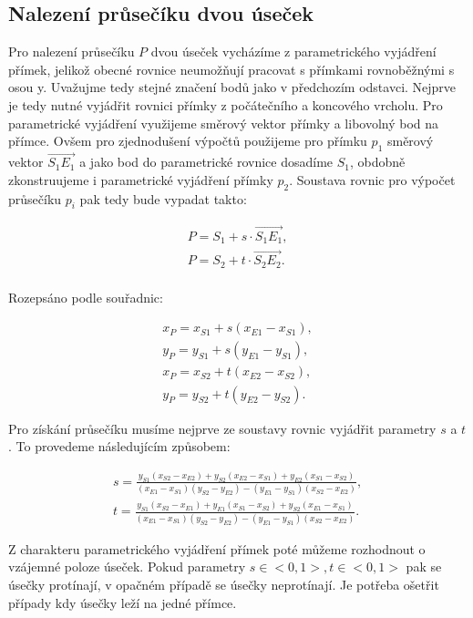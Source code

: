 \subsection{Nalezení průsečíku dvou úseček}
	Pro nalezení průsečíku $P$ dvou úseček vycházíme z parametrického vyjádření přímek, jelikož obecné rovnice neumožňují pracovat s přímkami rovnoběžnými s osou y. Uvažujme tedy stejné značení bodů jako v předchozím odstavci. Nejprve je tedy nutné vyjádřit rovnici přímky z počátečního a koncového vrcholu. Pro parametrické vyjádření využijeme směrový vektor přímky a libovolný bod na přímce. Ovšem pro zjednodušení výpočtů použijeme pro přímku $p_1$ směrový vektor $\overrightarrow{S_1E_1}$ a jako bod do parametrické rovnice dosadíme $S_1$, obdobně zkonstruujeme i parametrické vyjádření přímky $p_2$. Soustava rovnic pro výpočet průsečíku $p_i$ pak tedy bude vypadat takto:
	
\begin{align*} 
P = S_1 + s \cdot \overrightarrow{S_1E_1}, \\
P = S_2 + t \cdot \overrightarrow{S_2E_2}. \\
\end{align*}

Rozepsáno podle souřadnic:

\begin{align*} 
x_P = x_{S1} + s(x_{E1} - x_{S1}), \\
y_P = y_{S1} + s(y_{E1} - y_{S1}), \\
x_P = x_{S2} + t(x_{E2} - x_{S2}), \\
y_P = y_{S2} + t(y_{E2} - y_{S2}).
\end{align*}

Pro získání průsečíku musíme nejprve ze soustavy rovnic vyjádřit parametry $s$ a $t$. To provedeme následujícím způsobem:

\begin{align*} 
s = \frac{y_{S1}(x_{S2} - x_{E2}) + y_{S2}(x_{E2} - x_{S1}) + y_{E2}(x_{S1} - x_{S2})}{(x_{E1} - x_{S1}) (y_{S2} - y_{E2})   -   (y_{E1} - y_{S1}) (x_{S2} - x_{E2})}, \\
t = \frac{y_{S1}(x_{S2} - x_{E1}) + y_{E1}(x_{S1} - x_{S2}) + y_{S2}(x_{E1} - x_{S1})}{(x_{E1} - x_{S1}) (y_{S2} - y_{E2})   -   (y_{E1} - y_{S1}) (x_{S2} - x_{E2})}.
\end{align*}


Z charakteru parametrického vyjádření přímek poté můžeme rozhodnout o vzájemné poloze úseček. Pokud parametry $s \in <0,1>, t \in <0,1>$ pak se úsečky protínají, v opačném případě se úsečky neprotínají. Je potřeba ošetřit případy kdy úsečky leží na jedné přímce.


